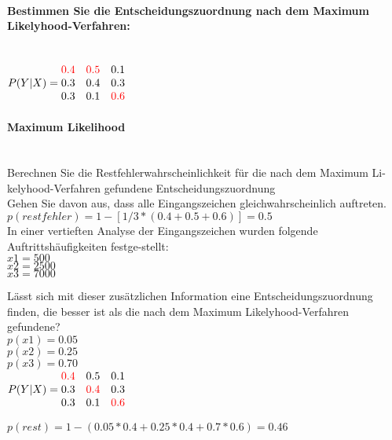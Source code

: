 \paragraph{Bestimmen Sie die Entscheidungszuordnung nach dem Maximum Likelyhood-Verfahren:}\mbox{}\\
$P(Y|X) = \begin{matrix}
    \textcolor{red}{0.4} & \textcolor{red}{0.5} & 0.1\\
    0.3 & 0.4 & 0.3\\
    0.3 & 0.1 & \textcolor{red}{0.6}
\end{matrix}$

\paragraph{Maximum Likelihood}\mbox{}\\
Berechnen Sie die Restfehlerwahrscheinlichkeit für die nach dem Maximum Li-kelyhood-Verfahren gefundene Entscheidungszuordnung\\
Gehen Sie davon aus, dass alle Eingangszeichen gleichwahrscheinlich auftreten.\\

$p(restfehler) = 1 - [1/3*(0.4+0.5+0.6)] = 0.5$\\

In einer vertieften Analyse der Eingangszeichen wurden folgende Auftrittshäufigkeiten festge-stellt:\\
$x1 = 500$\\
$x2 = 2500$\\
$x3 = 7000$\\

\columnbreak

Lässt sich mit dieser zusätzlichen Information eine Entscheidungszuordnung finden, die besser ist als die nach dem Maximum Likelyhood-Verfahren gefundene?\\
$p(x1) = 0.05$\\
$p(x2) = 0.25$\\
$p(x3) = 0.70$\\


$P(Y|X) = \begin{matrix}
    \textcolor{red}{0.4} & 0.5 & 0.1\\
    0.3 & \textcolor{red}{0.4} & 0.3\\
    0.3 & 0.1 & \textcolor{red}{0.6}
\end{matrix}$

$p(rest) = 1-(0.05*0.4 + 0.25*0.4 + 0.7*0.6) = 0.46 $\\

